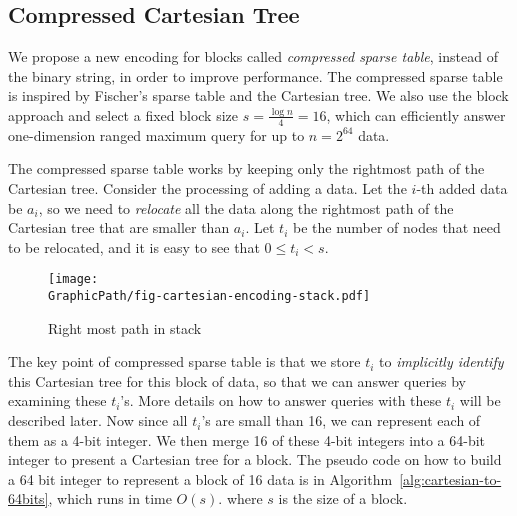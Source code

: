 
\subsection{Compressed Cartesian Tree} \label{sec:cct}

We propose a new encoding for blocks called {\em compressed sparse
  table}, instead of the binary string, in order to improve
performance.  The compressed sparse table is inspired by Fischer's
sparse table and the Cartesian tree.  We also use the block approach
and select a fixed block size $s = {{\frac{\log n}{4}}} = 16$, which
can efficiently answer one-dimension ranged maximum query for up to $n
= 2^{64}$ data.

The compressed sparse table works by keeping only the {\rm rightmost}
path of the Cartesian tree.  Consider the processing of adding a data.
Let the $i$-th added data be $a_i$, so we need to {\em relocate} all
the data along the rightmost path of the Cartesian tree that are
smaller than $a_i$.  Let $t_i$ be the number of nodes that need to be
relocated, and it is easy to see that $0 \le t_i < s$.

\begin{figure}[!thb]
  \centering
  \texttt{[image: \\GraphicPath/fig-cartesian-encoding-stack.pdf]}
  \caption{Right most path in stack}
  \label{fig:interval-cartesian}
\end{figure}

The key point of compressed sparse table is that we store $t_i$ to
{\em implicitly identify} this Cartesian tree for this block of data,
so that we can answer queries by examining these $t_i$'s.  More
details on how to answer queries with these $t_i$ will be described
later.  Now since all $t_i$'s are small than 16, we can represent each
of them as a 4-bit integer.  We then merge 16 of these 4-bit integers
into a 64-bit integer to present a Cartesian tree for a block.  The
pseudo code on how to build a 64 bit integer to represent a block of
16 data is in Algorithm~\ref{alg:cartesian-to-64bits}, which runs in
time $O(s)$. where $s$ is the size of a block.

